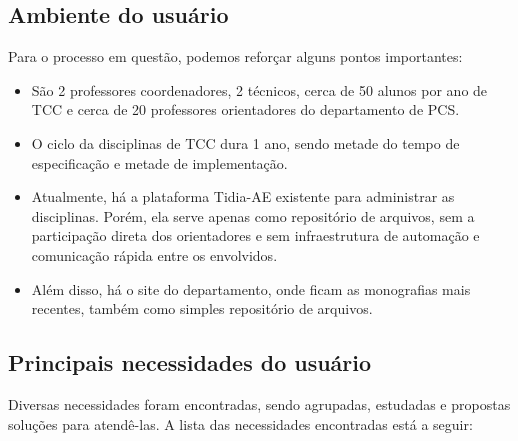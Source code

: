 \subsection{Ambiente do usuário}

Para o processo em questão, podemos reforçar alguns pontos importantes:

\begin{itemize}
    \item São 2 professores coordenadores, 2 técnicos, cerca de 50 alunos por ano de TCC e cerca de 20 professores orientadores do departamento de PCS.
    \item O ciclo da disciplinas de TCC dura 1 ano, sendo metade do tempo de especificação e metade de implementação.
    \item Atualmente, há a plataforma Tidia-AE existente para administrar as disciplinas. Porém, ela serve apenas como repositório de arquivos, sem a participação direta dos orientadores e sem infraestrutura de automação e comunicação rápida entre os envolvidos.
    \item Além disso, há o site do departamento, onde ficam as monografias mais recentes, também como simples repositório de arquivos.
\end{itemize}

\subsection{Principais necessidades do usuário}

Diversas necessidades foram encontradas, sendo agrupadas, estudadas e propostas soluções para atendê-las. A lista das necessidades encontradas está a seguir:

